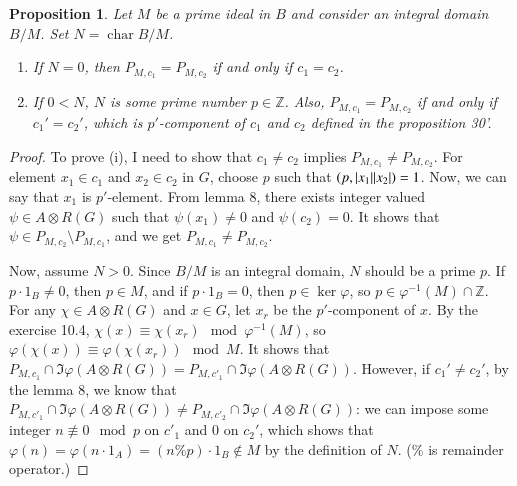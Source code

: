 \documentclass[a4paper, 12pt]{article}
\theoremstyle{Mydefinition}
\theoremstyle{Mytheorem}
\newtheorem{proposition}[statement]{Proposition}
\DeclareMathOperator{\Char}{char}
\begin{document}
\begin{proposition}
Let $M$ be a prime ideal in $B$ and consider an integral domain $B/M$. Set $N=\Char B/M$.
\begin{enumerate}
    \item If $N=0$, then $P_{M, c_1} = P_{M, c_2}$ if and only if $c_1=c_2$.
    \item If $0<N$, $N$ is some prime number $p\in \mathbb{Z}$. Also, $P_{M, c_1}=P_{M,c_2}$ if and only if $c_1'=c_2'$, which is $p'$-component of $c_1$ and $c_2$ defined in the proposition 30'.
\end{enumerate}
\end{proposition}
\begin{proof}
To prove (i), I need to show that $c_1\neq c_2$ implies $P_{M, c_1}\neq P_{M, c_2}$. For element $x_1\in c_1$ and $x_2\in c_2$ in $G$, choose $p$ such that $(p, \abs{x_1}\abs{x_2})=1$. Now, we can say that $x_1$ is $p'$-element. From lemma 8, there exists integer valued $\psi\in A\otimes R(G)$ such that $\psi(x_1)\neq 0$ and $\psi(c_2)=0$. It shows that $\psi\in P_{M, c_2}\setminus P_{M, c_1}$, and we get $P_{M, c_1}\neq P_{M, c_2}$.

Now, assume $N>0$. Since $B/M$ is an integral domain, $N$ should be a prime $p$. If $p\cdot 1_B\neq 0$, then $p\in M$, and if $p\cdot 1_B=0$, then $p\in\ker\varphi$, so $p\in \varphi^{-1}(M)\cap \mathbb{Z}$. For any $\chi\in A\otimes R(G)$ and $x\in G$, let $x_r$ be the $p'$-component of $x$. By the exercise 10.4, $\chi(x)\equiv \chi(x_r)\mod \varphi^{-1}(M)$, so $\varphi(\chi(x))\equiv \varphi(\chi(x_r))\mod M$. It shows that $P_{M, c_1}\cap \Im\varphi(A\otimes R(G)) = P_{M, c'_1}\cap \Im\varphi(A\otimes R(G))$. However, if $c_1'\neq c_2'$, by the lemma 8, we know that $P_{M, c'_1}\cap \Im\varphi(A\otimes R(G)) \neq P_{M, c'_2}\cap \Im\varphi(A\otimes R(G))$: we can impose some integer $n\not\equiv 0\mod p$ on $c'_1$ and $0$ on $c_2'$, which shows that $\varphi(n) = \varphi(n\cdot 1_A) = (n\% p)\cdot 1_B\not\in M$ by the definition of $N$. ($\%$ is remainder operator.)
\end{proof}
\end{document}
